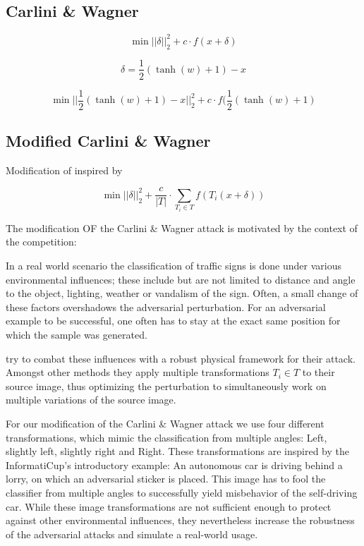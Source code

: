 \subsection{Carlini \& Wagner}

\citet{carlini2017towards}

\begin{equation}
\min ||\delta||^2_2 + c \cdot f(x + \delta)
\end{equation}

\begin{equation}
\delta = \frac{1}{2}(\tanh(w)+1) - x
\end{equation}

\begin{equation}
\min ||\frac{1}{2}(\tanh(w)+1)-x||^2_2 + c \cdot f(\frac{1}{2}(\tanh(w)+1)
\end{equation}

\subsection{Modified Carlini \& Wagner}

Modification of \cite{carlini2017towards} inspired by \cite{eykholt2018robust}

\begin{equation}
\min ||\delta||^2_2 + \frac{c}{|T|} \cdot \sum_{T_i \in T} f(T_i(x + \delta))
\end{equation}

The modification OF the Carlini \& Wagner attack is motivated by the context of the competition:

In a real world scenario the classification of traffic signs is done under various environmental influences;
these include but are not limited to distance and angle to the object, lighting, weather or vandalism of the sign.
Often, a small change of these factors overshadows the adversarial perturbation. %
For an adversarial example to be successful, one often has to stay at the exact same position for which the sample was generated. 

\citet{eykholt2018robust} try to combat these influences with a robust physical framework for their attack.
Amongst other methods they apply multiple transformations $T_i \in T$ to their source image,
thus optimizing the perturbation to simultaneously work on multiple variations of the source image.

For our modification of the Carlini \& Wagner attack we use four different transformations,
which mimic the classification from multiple angles: Left, slightly left, slightly right and Right.
These transformations are inspired by the InformatiCup's introductory example:
An autonomous car is driving behind a lorry, on which an adversarial sticker is placed.
This image has to fool the classifier from multiple angles to successfully yield misbehavior of the self-driving car.
While these image transformations are not sufficient enough to protect against other environmental influences,
they nevertheless increase the robustness of the adversarial attacks and simulate a real-world usage.

